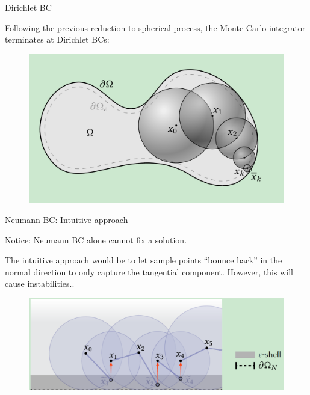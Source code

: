 \documentclass{beamer}
\begin{document}
\begin{frame}{Dirichlet BC}

	Following the previous reduction to spherical process, the Monte Carlo integrator terminates at Dirichlet BCs:
	
	\begin{figure}[htbp]
		\centering
		\includegraphics[scale=0.3]{img/DBC.png}
	\end{figure}


\end{frame}

\begin{frame}{Neumann BC: Intuitive approach}
	
	Notice: Neumann BC alone cannot fix a solution.

	The intuitive approach would be to let sample points ``bounce back'' in the normal direction to only capture the tangential component. However, this will cause instabilities..

	\begin{figure}[htbp]
		\centering
		\includegraphics[scale=0.4]{img/NBC-1.png}
	\end{figure}

\end{frame}
\end{document}
